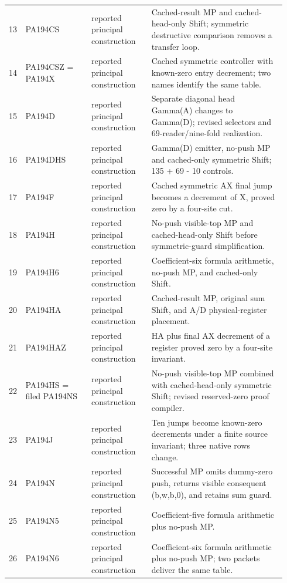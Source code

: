 \begin{longtable}{p{0.035\linewidth}p{0.23\linewidth}p{0.21\linewidth}p{0.47\linewidth}}
13 & PA194CS & reported principal construction & Cached-result MP and cached-head-only Shift; symmetric destructive comparison removes a transfer loop.\\[4pt]
14 & PA194CSZ = PA194X & reported principal construction & Cached symmetric controller with known-zero entry decrement; two names identify the same table.\\[4pt]
15 & PA194D & reported principal construction & Separate diagonal head Gamma(A) changes to Gamma(D); revised selectors and 69-reader/nine-fold realization.\\[4pt]
16 & PA194DHS & reported principal construction & Gamma(D) emitter, no-push MP and cached-only symmetric Shift; 135 + 69 - 10 controls.\\[4pt]
17 & PA194F & reported principal construction & Cached symmetric AX final jump becomes a decrement of X, proved zero by a four-site cut.\\[4pt]
18 & PA194H & reported principal construction & No-push visible-top MP and cached-head-only Shift before symmetric-guard simplification.\\[4pt]
19 & PA194H6 & reported principal construction & Coefficient-six formula arithmetic, no-push MP, and cached-only Shift.\\[4pt]
20 & PA194HA & reported principal construction & Cached-result MP, original sum Shift, and A/D physical-register placement.\\[4pt]
21 & PA194HAZ & reported principal construction & HA plus final AX decrement of a register proved zero by a four-site invariant.\\[4pt]
22 & PA194HS = filed PA194NS & reported principal construction & No-push visible-top MP combined with cached-head-only symmetric Shift; revised reserved-zero proof compiler.\\[4pt]
23 & PA194J & reported principal construction & Ten jumps become known-zero decrements under a finite source invariant; three native rows change.\\[4pt]
24 & PA194N & reported principal construction & Successful MP omits dummy-zero push, returns visible consequent (b,w,b,0), and retains sum guard.\\[4pt]
25 & PA194N5 & reported principal construction & Coefficient-five formula arithmetic plus no-push MP.\\[4pt]
26 & PA194N6 & reported principal construction & Coefficient-six formula arithmetic plus no-push MP; two packets deliver the same table.\\[4pt]

\end{longtable}
